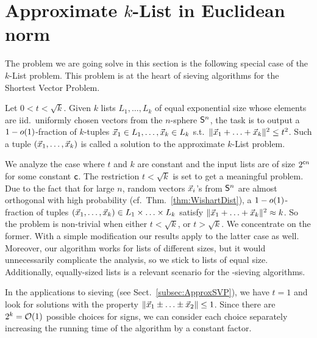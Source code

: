 \section{Approximate $k$-List in Euclidean norm} \label{sec:Approx_kList_Euclid}

The problem we are going solve in this section is the following special case of the $k$-List problem. This problem is at the heart of sieving algorithms for the Shortest Vector Problem.


\begin{definition} \label{def:kListL2}
Let $0 < t < \sqrt{k}$. Given $k$ lists $L_1, \ldots, L_k$ of equal exponential size whose elements are iid.\ uniformly chosen vectors from the $n$-sphere $\mathsf{S}^{n}$, the task is to output a $1-o(1)$-fraction of $k$-tuples $\vec x_1 \in L_1, \ldots, \vec x_k \in L_k$ s.t.\ $\|\vec x_1 + \ldots + \vec x_k \|^2 \leq t^2$. Such a tuple $(\vec x_1, \ldots, \vec x_k)$ is called a solution to the approximate $k$-List problem. 
\end{definition}

We analyze the case where $t$ and $k$ are constant and the input lists are of size $2^{\mathsf{c} n}$ for some constant $\mathsf{c}$. The restriction $t < \sqrt{k}$ is set to get a meaningful problem. Due to the fact that for large $n$, random vectors $\vec x_i$'s from $\mathsf{S}^{n}$ are almost orthogonal with high probability (cf.\ Thm.~\ref{thm:WishartDist}), a $1-o(1)$-fraction of tuples $(\vec x_1, \ldots, \vec x_k) \in L_1 \times \ldots \times L_k$ satisfy $\| \vec x_1 + \ldots + \vec x_k \|^2 \approx k$. So the problem is non-trivial when either $t< \sqrt{k}$, or $t>\sqrt{k}$. We concentrate on the former. With a simple modification our results apply to the latter case as well. Moreover, our algorithm works for lists of different sizes, but it would unnecessarily complicate the analysis, so we stick to lists of equal size. Additionally, equally-sized lists is a relevant scenario for the \SVP-sieving algorithms.

In the applications to sieving (see Sect.~\ref{subsec:ApproxSVP}), we have $t=1$ and look for solutions with the property $\|\vec x_1 \pm \ldots \pm \vec x_2 \| \leq 1$. Since there are $2^k  = \mathcal{O}(1)$ possible choices for signs, we can consider each choice separately increasing the running time of the algorithm by a constant factor. %









